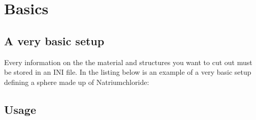 \section{Basics}
\subsection{A very basic setup}

Every information on the the material and structures you want to cut out must be stored in an INI file. In the listing below is an example of a very basic setup defining a sphere made up of Natriumchloride:



\subsection{Usage}
